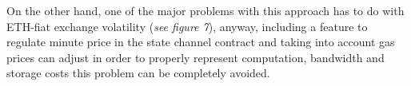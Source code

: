 \documentclass[12pt]{amsart}
\begin{document}
\begin{multicols}{2}
\vspace{0.35cm}

On the other hand, one of the major problems with this approach has to do
with ETH-fiat exchange volatility
(\textit{see figure 7}), anyway, including
a feature to regulate minute price in the state channel
contract and taking into account gas prices can adjust
in order to properly
represent computation, bandwidth and storage costs this
problem can be completely avoided.




\end{multicols}
\end{document}
